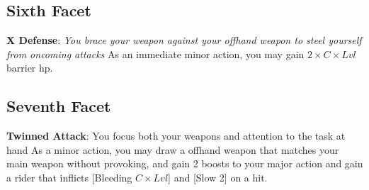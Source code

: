 \begin{multicols*}{2}
\subsection*{Sixth Facet}
\textbf{X Defense}: \emph{You brace your weapon against your offhand weapon to steel yourself from oncoming attacks} As an immediate minor action, you may gain $2 \times C\times Lvl$ barrier hp. 

\subsection*{Seventh Facet\perk}
\textbf{Twinned Attack}: You focus both your weapons and attention to the task at hand
As a minor action, you may draw a offhand weapon that matches your main weapon without provoking, and gain 2 boosts to your major action and gain a rider that inflicts [Bleeding $C\times Lvl$] and [Slow 2] on a hit.
\end{multicols*}
